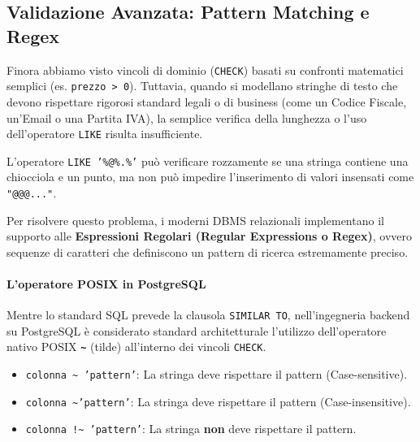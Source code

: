 \subsection{Validazione Avanzata: Pattern Matching e Regex}

Finora abbiamo visto vincoli di dominio (\texttt{CHECK}) basati su confronti matematici semplici (es. \texttt{prezzo > 0}). Tuttavia, quando si modellano stringhe di testo che devono rispettare rigorosi standard legali o di business (come un Codice Fiscale, un'Email o una Partita IVA), la semplice verifica della lunghezza o l'uso dell'operatore \texttt{LIKE} risulta insufficiente.

L'operatore \texttt{LIKE '\%@\%.\%'} può verificare rozzamente se una stringa contiene una chiocciola e un punto, ma non può impedire l'inserimento di valori insensati come \texttt{"@@@..."}.

Per risolvere questo problema, i moderni DBMS relazionali implementano il supporto alle \textbf{Espressioni Regolari (Regular Expressions o Regex)}, ovvero sequenze di caratteri che definiscono un pattern di ricerca estremamente preciso.

\paragraph{L'operatore POSIX in PostgreSQL}
Mentre lo standard SQL prevede la clausola \texttt{SIMILAR TO}, nell'ingegneria backend su PostgreSQL è considerato standard architetturale l'utilizzo dell'operatore nativo POSIX \textbf{\texttt{\textasciitilde}} (tilde) all'interno dei vincoli \texttt{CHECK}.

\begin{itemize}
    \item \texttt{colonna \textasciitilde\ 'pattern'}: La stringa deve rispettare il pattern (Case-sensitive).
    \item \texttt{colonna \textasciitilde* 'pattern'}: La stringa deve rispettare il pattern (Case-insensitive).
    \item \texttt{colonna !\textasciitilde\ 'pattern'}: La stringa \textbf{non} deve rispettare il pattern.
\end{itemize}

